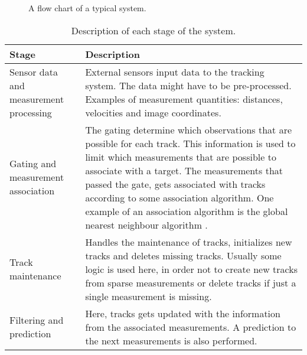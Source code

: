 \begin{figure}[!ht]
	\centering
	\caption{\label{fig:trackingflowchart} A flow chart of a typical \abbrMTT system.}
\end{figure}

\begin{table}[!ht]
	\centering
	\caption{\label{tab:trackingflowchart} Description of each stage of the \abbrMTT system.}
	\begin{tabular}{|>{\centering\arraybackslash}p{4cm}|p{8cm}|}
		\hline
		\textbf{Stage} & \textbf{Description} \\
		\hline
		Sensor data and measurement processing & External sensors input data to the tracking system. The data might have to be pre-processed. Examples of measurement quantities: distances, velocities and image coordinates. \\
		\hline
		Gating and measurement association & The gating determine which observations that are possible for each track. This information is used to limit which measurements that are possible to associate with a target. The measurements that passed the gate, gets associated with tracks according to some association algorithm. One example of an association algorithm is the global nearest neighbour algorithm \cite{Blackman:1999}. \\
		\hline
		Track maintenance & Handles the maintenance of tracks, initializes new tracks and deletes missing tracks. Usually some logic is used here, in order not to create new tracks from sparse measurements or delete tracks if just a single measurement is missing. \\
		\hline
		Filtering and prediction & Here, tracks gets updated with the information from the associated measurements. A prediction to the next measurements is also performed. \\
		\hline
	\end{tabular}
\end{table}

